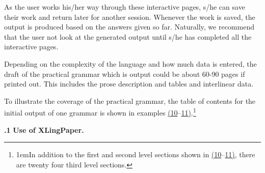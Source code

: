 \documentclass[12pt]{article}
\begin{document}
As the user works his/her way through these interactive pages, s/he can save their work and return later for another session. Whenever the work is saved, the output is produced based on the answers given so far. Naturally, we recommend that the user not look at the generated output until s/he has completed all the interactive pages.\par{}\indent Depending on the complexity of the language and how much data is entered, the draft of the practical grammar which is output could be about 60-90 pages if printed out. This includes the prose description and tables and interlinear data.\par{}\indent To illustrate the coverage of the practical grammar, the table of contents for the initial output of one grammar is shown in examples \hyperlink{xContents1}{(10}–\hyperlink{xContents2}{11)}.\protect\footnote[4]{{\parindent1em\protect\hypertarget{nThirdLevelSections}{}In addition to the first and second level sections shown in \hyperlink{xContents1}{(10}–\hyperlink{xContents2}{11)}, there are twenty four third level sections.}}\par{}{\vspace{12pt}\raggedright{}
}{\vspace{12pt}\raggedright{}
}\vspace{.25in}\noindent\protect\hypertarget{sXLingPaper}{{\noindent
\textbf{{.1 }}}}{\noindent
\textbf{{\protect\noindent
Use of {XLingPaper}. }}}
\end{document}
